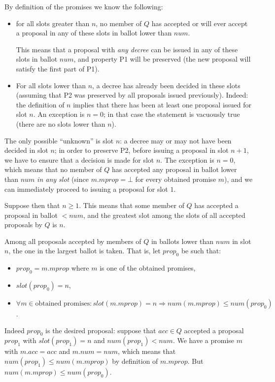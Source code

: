 \documentclass[12pt,a4paper,en]{pracamgr}
\newcommand{\ti}[1]{\textit{#1}}
\begin{document}
By definition of the promises we know the following:
\begin{itemize}
    \item for all slots greater than $n$, no member of $Q$ has accepted or will ever accept a proposal in any of these slots in ballot lower than $num$.

        This means that a proposal with \ti{any decree} can be issued in any of these slots in ballot $num$, and property P1 will be preserved (the new proposal will satisfy the first part of P1).
    \item For all slots lower than $n$, a decree has already been decided in these slots (assuming that P2 was preserved by all proposals issued previously). Indeed: the definition of $n$ implies that there has been at least one proposal issued for slot $n$. An exception is $n = 0$; in that case the statement is vacuously true (there are no slots lower than $n$).
\end{itemize}
The only possible ``unknown'' is slot $n$: a decree may or may not have been decided in slot $n$; in order to preserve P2, before issuing a proposal in slot $n+1$, we have to ensure that a decision is made for slot $n$. The exception is $n = 0$, which means that no member of $Q$ has accepted any proposal in ballot lower than $num$ \ti{in any slot} (since $m.mprop = \bot$ for every obtained promise $m$), and we can immediately proceed to issuing a proposal for slot $1$.

Suppose then that $n \ge 1$. This means that some member of $Q$ has accepted a proposal in ballot $< num$, and the greatest slot among the slots of all accepted proposals by $Q$ is $n$.

Among all proposals accepted by members of $Q$ in ballots lower than $num$ in slot $n$, the one in the largest ballot is taken. That is, let $prop_0$ be such that:
\begin{itemize}
    \item $prop_0 = m.mprop$ where $m$ is one of the obtained promises,
    \item $slot(prop_0) = n$,
    \item $\forall m \in \text{obtained promises}: slot(m.mprop) = n \Rightarrow num(m.mprop) \le num(prop_0)$.
\end{itemize}
Indeed $prop_0$ is the desired proposal: suppose that $acc \in Q$ accepted a proposal $prop_1$ with $slot(prop_1) = n$ and $num(prop_1) < num$. We have a promise $m$ with $m.acc = acc$ and $m.num = num$, which means that $num(prop_1) \le num(m.mprop)$ by definition of $m.mprop$. But $num(m.mprop) \le num(prop_0)$.
\end{document}
